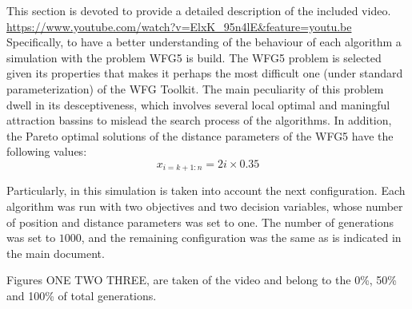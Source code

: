 This section is devoted to provide a detailed description of the included video.
\url{https://www.youtube.com/watch?v=ElxK_95n4lE&feature=youtu.be}
%
Specifically, to have a better understanding of the behaviour of each algorithm a simulation with the problem WFG5 is build.
%
The WFG5 problem is selected given its properties that makes it perhaps the most difficult one (under standard parameterization) of the WFG Toolkit.
%
The main peculiarity of this problem dwell in its desceptiveness, which involves several local optimal and maningful attraction bassins to mislead the search process of the algorithms.
%
In addition, the Pareto optimal solutions of the distance parameters of the WFG5 have the following values:
%
\begin{equation}
   x_{i=k+1:n} = 2i \times 0.35
\end{equation}

Particularly, in this simulation is taken into account the next configuration.
%
Each algorithm was run with two objectives and two decision variables, whose number of position and distance parameters was set to one.
%
The number of generations was set to $1000$, and the remaining configuration was the same as is indicated in the main document.
%

Figures ONE TWO THREE, are taken of the video and belong to the 0\%, 50\% and 100\% of total generations.

